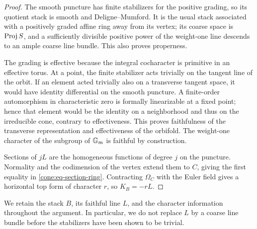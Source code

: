 \begin{proof}
The smooth puncture has finite stabilizers for the positive
grading, so its quotient stack is smooth and Deligne--Mumford.
It is the usual stack associated with a positively graded
affine ring away from its vertex; its coarse space is
\(\operatorname{Proj} S\), and a sufficiently divisible positive power of
the weight-one line descends to an ample coarse line bundle.
This also proves properness.

The grading is effective because the integral cocharacter
is primitive in an effective torus. At a point, the finite
stabilizer acts trivially on the tangent line of the orbit.
If an element acted trivially also on a transverse tangent
space, it would have identity differential on the smooth
puncture. A finite-order automorphism in characteristic zero
is formally linearizable at a fixed point; hence that
element would be the identity on a neighborhood and thus
on the irreducible cone, contrary to effectiveness.
This proves faithfulness of the transverse representation
and effectiveness of the orbifold. The weight-one character
of the subgroup of \(\mathbb G_m\) is faithful by construction.

Sections of \(jL\) are the homogeneous functions of degree
\(j\) on the puncture. Normality and the codimension of the
vertex extend them to \(C\), giving the first equality in
\eqref{cone:eq-section-ring}. Contracting \(\Omega_C\)
with the Euler field gives a horizontal top form of
character \(r\), so \(K_B=-rL\).
\end{proof}

We retain the stack \(B\), its faithful line \(L\), and the
character information throughout the argument. In particular,
we do not replace \(L\) by a coarse line bundle before the
stabilizers have been shown to be trivial.
